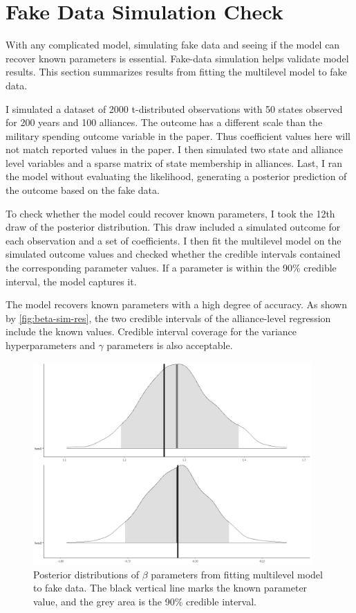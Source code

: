 \documentclass[12pt]{article}
\begin{document}
\section{Fake Data Simulation Check}


With any complicated model, simulating fake data and seeing if the model can recover known parameters is essential. 
Fake-data simulation helps validate model results. 
This section summarizes results from fitting the multilevel model to fake data.


I simulated a dataset of 2000 t-distributed observations with 50 states observed for 200 years and 100 alliances. 
The outcome has a different scale than the military spending outcome variable in the paper.
Thus coefficient values here will not match reported values in the paper.  
I then simulated two state and alliance level variables and a sparse matrix of state membership in alliances. 
Last, I ran the model without evaluating the likelihood, generating a posterior prediction of the outcome based on the fake data.


To check whether the model could recover known parameters, I took the 12th draw of the posterior distribution.
This draw included a simulated outcome for each observation and a set of coefficients. 
I then fit the multilevel model on the simulated outcome values and checked whether the credible intervals contained the corresponding parameter values. 
If a parameter is within the 90\% credible interval, the model captures it. 


The model recovers known parameters with a high degree of accuracy. 
As shown by \autoref{fig:beta-sim-res}, the two credible intervals of the alliance-level regression include the known values.
Credible interval coverage for the variance hyperparameters and $\gamma$ parameters is also acceptable. 


\begin{figure}[htbp]
	\centering
		\includegraphics[width=0.95\textwidth]{beta-sim-res.png}
	\caption{Posterior distributions of $\beta$ parameters from fitting multilevel model to fake data. The black vertical line marks the known parameter value, and the grey area is the 90\% credible interval.}
	\label{fig:beta-sim-res}
\end{figure}
\end{document}
